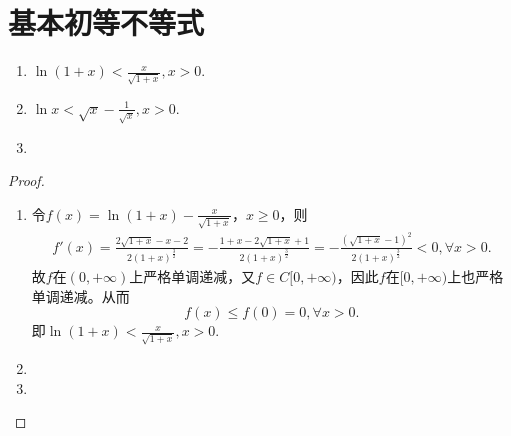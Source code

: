 \documentclass[../../main.tex]{subfiles}
\begin{document}
\section{基本初等不等式}

\begin{proposition}[关于ln的常用不等式]\label{proposition:关于ln的常用不等式}
\begin{enumerate}[(1)]
\item\label{proposition:关于ln的常用不等式1} $\ln \left( 1+x \right) <\frac{x}{\sqrt{1+x}},x>0.$

\item \label{proposition:关于ln的常用不等式2} $\ln x<\sqrt{x}-\frac{1}{\sqrt{x}},x>0.$

\item \label{proposition:关于ln的常用不等式3}
\end{enumerate}
\end{proposition}
\begin{proof}
\begin{enumerate}[(1)]
\item 令\(f(x)=\ln(1 + x)-\frac{x}{\sqrt{1 + x}}\)，\(x\geqslant 0\)，则
\begin{align*}
f'\left( x \right) =\frac{2\sqrt{1+x}-x-2}{2\left( 1+x \right) ^{\frac{3}{2}}}=-\frac{1+x-2\sqrt{1+x}+1}{2\left( 1+x \right) ^{\frac{3}{2}}}=-\frac{\left( \sqrt{1+x}-1 \right) ^2}{2\left( 1+x \right) ^{\frac{3}{2}}}<0,\forall x>0.
\end{align*}
故\(f\)在\((0,+\infty)\)上严格单调递减，又\(f\in C[0,+\infty)\)，因此\(f\)在\([0,+\infty)\)上也严格单调递减。从而
\[
f(x)\leqslant f(0)=0,\forall x>0.
\]
即\(\ln(1 + x)<\frac{x}{\sqrt{1 + x}},x>0\).

\item 

\item 
\end{enumerate}
\end{proof}
\end{document}
